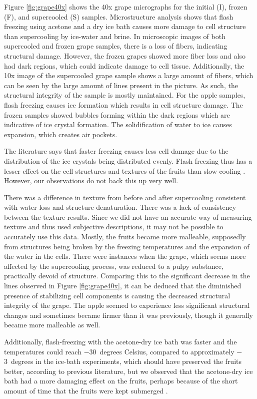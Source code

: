 Figure \ref{fig:grape40x} shows the 40x grape micrographs for the initial (I), frozen (F), and supercooled (S) samples. Microstructure analysis shows that flash freezing using acetone and a dry ice bath causes more damage to cell structure than supercooling by ice-water and brine. In microscopic images of both supercooled and frozen grape samples, there is a loss of fibers, indicating structural damage. However, the frozen grapes showed more fiber loss and also had dark regions, which could indicate damage to cell tissue. Additionally, the 10x image of the supercooled grape sample shows a large amount of fibers, which can be seen by the large amount of lines present in the picture. As such, the structural integrity of the sample is mostly maintained. For the apple samples, flash freezing causes ice formation which results in cell structure damage. The frozen samples showed bubbles forming within the dark regions which are indicative of ice crystal formation. The solidification of water to ice causes expansion, which creates air pockets.

The literature says that faster freezing causes less cell damage due to
the distribution of the ice crystals being distributed evenly.
Flash freezing thus has a lesser effect on the cell structures and
textures of the fruits than slow cooling \cite{narayana2023}. However,
our observations do not back this up very well.

There was a difference in texture from before and after supercooling
consistent with water loss and structure denaturation. There was a lack
of consistency between the texture results. Since we did not have an
accurate way of measuring texture and thus used subjective descriptions,
it may not be possible to accurately use this data. Mostly, the fruits
became more malleable, supposedly from structures being broken by the
freezing temperatures and the expansion of the water in the cells. There
were instances when the grape, which seems more affected by the
supercooling process, was reduced to a pulpy substance, practically
devoid of structure. Comparing this to the significant decrease in the
	lines observed in Figure \ref{fig:grape40x}, it can be deduced that the
diminished presence of stabilizing cell components is causing the
decreased structural integrity of the grape. The apple seemed to
experience less significant structural changes and sometimes became
firmer than it was previously, though it generally became more malleable
as well.

Additionally, flash-freezing with the acetone-dry ice bath was faster
and the temperatures could reach $-$30~degrees Celsius, compared to
approximately $-$3~degrees in the ice-bath experiments, which should have
preserved the fruits better, according to previous literature, but we
observed that the acetone-dry ice bath had a more damaging effect on the
fruits, perhaps because of the short amount of time that the fruits were
kept submerged \cite{narayana2023}.

